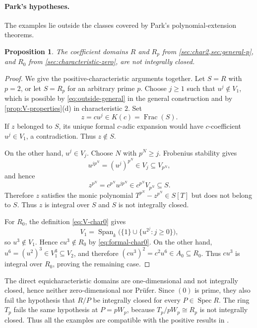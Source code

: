 \documentclass[11pt,reqno]{amsart}
\numberwithin{equation}{section}
\theoremstyle{plain}
\newtheorem{proposition}[theorem]{Proposition}
\theoremstyle{definition}
\theoremstyle{remark}
\newcommand{\Spec}{\operatorname{Spec}}
\newcommand{\Frac}{\operatorname{Frac}}
\newcommand{\Span}{\operatorname{Span}}
\begin{document}
\paragraph*{Park's hypotheses.}
The examples lie outside the classes covered by Park's polynomial-extension
theorems.

\begin{proposition}\label{prop:not-normal}
The coefficient domains $R$ and $R_p$ from
\cref{sec:char2,sec:general-p}, and $R_0$ from
\cref{sec:characteristic-zero}, are not integrally closed.
\end{proposition}

\begin{proof}
We give the positive-characteristic arguments together.  Let $S=R$ with
$p=2$, or let $S=R_p$ for an arbitrary prime $p$.  Choose
$j\geq1$ such that $u^j\notin V_1$, which is possible by
\eqref{eq:outside-general} in the general construction and by
\cref{prop:V-properties}(d) in characteristic $2$.  Set
\[
  z=cu^j\in K(c)=\Frac(S).
\]
If $z$ belonged to $S$, its unique formal $c$-adic expansion would have
$c$-coefficient $u^j\in V_1$, a contradiction.  Thus $z\notin S$.

On the other hand, $u^j\in V_j$.  Choose $N$ with $p^N\geq j$.
Frobenius stability gives
\[
  u^{jp^N}=(u^j)^{p^N}\in V_j\subseteq V_{p^N},
\]
and hence
\[
  z^{p^N}=c^{p^N}u^{jp^N}\in c^{p^N}V_{p^N}\subseteq S.
\]
Therefore $z$ satisfies the monic polynomial
$T^{p^N}-z^{p^N}\in S[T]$ but does not belong to $S$.  Thus $z$ is
integral over $S$ and $S$ is not integrally closed.

For $R_0$, the definition \eqref{eq:V-char0} gives
\[
 V_1=\Span_k\bigl(\{1\}\cup\{u^{2^j}:j\geq0\}\bigr),
\]
so $u^3\notin V_1$.  Hence $cu^3\notin R_0$ by
\eqref{eq:formal-char0}.  On the other hand,
$u^6=(u^2)^3\in V_1^3\subseteq V_2$, and therefore
$(cu^3)^2=c^2u^6\in A_0\subseteq R_0$.  Thus $cu^3$ is integral over
$R_0$, proving the remaining case.
\end{proof}

The direct equicharacteristic domains are one-dimensional and not integrally
closed, hence neither zero-dimensional nor Pr\"ufer.  Since $(0)$ is prime,
they also fail the hypothesis that $R/P$ be integrally closed for every
$P\in\Spec R$.  The ring $T_p$ fails the same hypothesis at $P=pW_p$, because
$T_p/pW_p\cong R_p$ is not integrally closed.  Thus all the examples are
compatible with the positive results in \cite{Park2019}.
\end{document}
